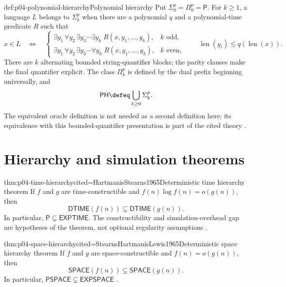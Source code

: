 \begin{hbdefinition}{def:p04-polynomial-hierarchy}{Polynomial hierarchy}
Put \(\Sigma^p_0=\Pi^p_0=\mathsf P\).  For \(k\geq1\), a language \(L\)
belongs to \(\Sigma^p_k\) when there are a polynomial \(q\) and a
polynomial-time predicate \(R\) such that
\[
 x\in L\quad\Leftrightarrow\quad
 \begin{cases}
  \exists y_1\,\forall y_2\,\exists y_3\cdots\exists y_k\;
    R(x,y_1,\ldots,y_k),&k\text{ odd},\\
  \exists y_1\,\forall y_2\,\exists y_3\cdots\forall y_k\;
    R(x,y_1,\ldots,y_k),&k\text{ even},
 \end{cases}
 \qquad \operatorname{len}(y_i)\leq q(\operatorname{len}(x)).
\]
There are \(k\) alternating bounded string-quantifier blocks; the parity
clauses make the final quantifier explicit.  The class
\(\Pi^p_k\) is defined by the dual prefix beginning universally, and
\[
 \mathsf{PH}\defeq\bigcup_{k\geq0}\Sigma^p_k.
\]
The equivalent oracle definition is not needed as a second definition here;
its equivalence with this bounded-quantifier presentation is part of the
cited theory \cite{Stockmeyer1976,AroraBarak2009}.
\end{hbdefinition}

\section{Hierarchy and simulation theorems}
\label{sec:p04-complexity-hierarchies}

\begin{hbtheorem}{thm:p04-time-hierarchy}{cited=HartmanisStearns1965}{Deterministic time hierarchy theorem}
If \(f\) and \(g\) are time-constructible and
\(f(n)\log f(n)=o(g(n))\), then
\[
 \mathsf{DTIME}(f(n))\subsetneq\mathsf{DTIME}(g(n)).
\]
In particular, \(\mathsf P\subsetneq\mathsf{EXPTIME}\).  The
constructibility and simulation-overhead gap are hypotheses of the theorem,
not optional regularity assumptions \cite[thm.~3.1]{AroraBarak2009}.
\end{hbtheorem}

\begin{hbtheorem}{thm:p04-space-hierarchy}{cited=StearnsHartmanisLewis1965}{Deterministic space hierarchy theorem}
If \(f\) and \(g\) are space-constructible and \(f(n)=o(g(n))\), then
\[
 \mathsf{SPACE}(f(n))\subsetneq\mathsf{SPACE}(g(n)).
\]
In particular,
\(\mathsf{PSPACE}\subsetneq\mathsf{EXPSPACE}\)
\cite[thm.~3.2]{AroraBarak2009}.
\end{hbtheorem}

